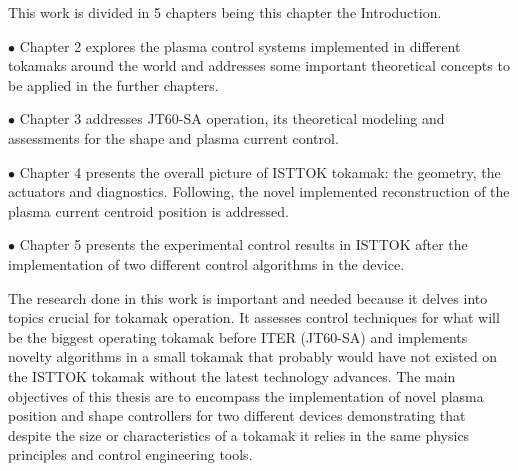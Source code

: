 This work is divided in 5 chapters being this chapter the Introduction.\smallskip

$\bullet$ Chapter 2 explores the plasma control systems implemented in different tokamaks around the world and addresses some important theoretical concepts to be applied in the further chapters.\smallskip

$\bullet$ Chapter 3 addresses JT60-SA operation, its theoretical modeling and assessments for the shape and plasma current control.\smallskip

$\bullet$ Chapter 4 presents the overall picture of ISTTOK tokamak: the geometry, the actuators and diagnostics. Following, the novel  implemented  reconstruction of the plasma current centroid position is addressed.\smallskip

$\bullet$ Chapter 5  presents the experimental control results in ISTTOK after the implementation of two different control algorithms in the device. \smallskip

The research done in this work is important and needed because it delves into topics crucial for tokamak operation. It assesses control techniques for what will be the biggest operating tokamak before ITER (JT60-SA) and implements novelty algorithms in a small tokamak that probably would have not  existed on the ISTTOK tokamak without the latest technology advances. The main objectives of this thesis are to encompass the implementation of novel  plasma position and shape controllers for two different devices demonstrating that despite the size or characteristics of a tokamak it relies in the same physics principles and control engineering tools.\smallskip 
